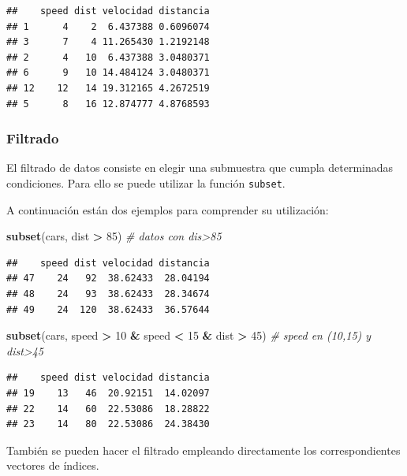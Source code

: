 \documentclass[]{book}
\newenvironment{Shaded}{\begin{snugshade}}{\end{snugshade}}
\newcommand{\KeywordTok}[1]{\textcolor[rgb]{0.13,0.29,0.53}{\textbf{#1}}}
\newcommand{\DecValTok}[1]{\textcolor[rgb]{0.00,0.00,0.81}{#1}}
\newcommand{\StringTok}[1]{\textcolor[rgb]{0.31,0.60,0.02}{#1}}
\newcommand{\CommentTok}[1]{\textcolor[rgb]{0.56,0.35,0.01}{\textit{#1}}}
\newcommand{\OperatorTok}[1]{\textcolor[rgb]{0.81,0.36,0.00}{\textbf{#1}}}
\newcommand{\NormalTok}[1]{#1}
\begin{document}
\begin{verbatim}
##    speed dist velocidad distancia
## 1      4    2  6.437388 0.6096074
## 3      7    4 11.265430 1.2192148
## 2      4   10  6.437388 3.0480371
## 6      9   10 14.484124 3.0480371
## 12    12   14 19.312165 4.2672519
## 5      8   16 12.874777 4.8768593
\end{verbatim}

\subsubsection{Filtrado}\label{filtrado}

El filtrado de datos consiste en elegir una submuestra que cumpla
determinadas condiciones. Para ello se puede utilizar la función
\texttt{subset}.

A continuación están dos ejemplos para comprender su utilización:

\begin{Shaded}
\begin{Highlighting}[]
\KeywordTok{subset}\NormalTok{(cars, dist }\OperatorTok{>}\StringTok{ }\DecValTok{85}\NormalTok{) }\CommentTok{# datos con dis>85}
\end{Highlighting}
\end{Shaded}

\begin{verbatim}
##    speed dist velocidad distancia
## 47    24   92  38.62433  28.04194
## 48    24   93  38.62433  28.34674
## 49    24  120  38.62433  36.57644
\end{verbatim}

\begin{Shaded}
\begin{Highlighting}[]
\KeywordTok{subset}\NormalTok{(cars, speed }\OperatorTok{>}\StringTok{ }\DecValTok{10} \OperatorTok{&}\StringTok{ }\NormalTok{speed }\OperatorTok{<}\StringTok{ }\DecValTok{15} \OperatorTok{&}\StringTok{ }\NormalTok{dist }\OperatorTok{>}\StringTok{ }\DecValTok{45}\NormalTok{) }\CommentTok{# speed en (10,15) y dist>45}
\end{Highlighting}
\end{Shaded}

\begin{verbatim}
##    speed dist velocidad distancia
## 19    13   46  20.92151  14.02097
## 22    14   60  22.53086  18.28822
## 23    14   80  22.53086  24.38430
\end{verbatim}

También se pueden hacer el filtrado empleando directamente los
correspondientes vectores de índices.
\end{document}
